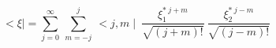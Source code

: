 \begin{equation}
<\xi\mid = \sum_{j=0}^\infty~\sum_{m=-j}^j ~<j,m\mid  ~\frac{\xi_1^{*~j+m}}{\sqrt{(j+m)!}}~\frac{\xi_2^{*~j-m}}{\sqrt{(j-m)!}}
\end{equation}


